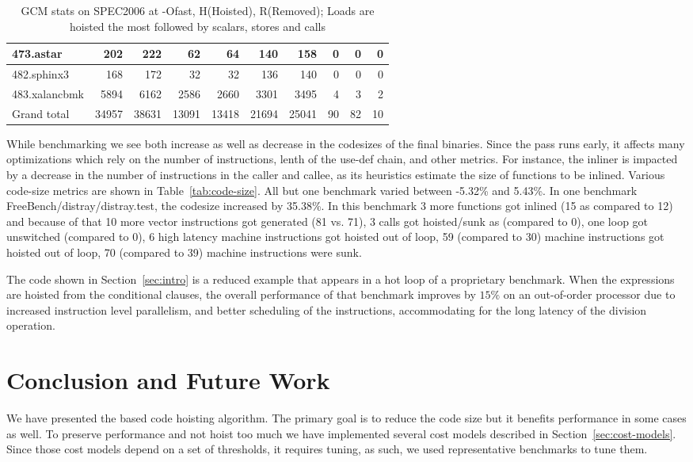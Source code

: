 \documentclass[acmlarge,review,anonymous]{acmart}\settopmatter{printfolios=true}
\begin{document}
\begin{table}[h!]
\begin{center}
\begin{tabular}{|l|r|r|r|r|r|r|r|r|r|}
 473.astar	  &  202	& 222	  &  62	  & 64	   & 140	& 158		& 0	& 0	& 0		\\\hline
 482.sphinx3	  &  168	& 172	  &  32	  & 32	   & 136	& 140		& 0	& 0	& 0		\\\hline
 483.xalancbmk	  &  5894	& 6162	  &  2586 & 2660   & 3301	& 3495		& 4	& 3	& 2	        \\\hline
 Grand total      &34957	&38631	  &13091  &13418   &21694	&25041	        &90	&82     &10             \\\hline
    \end{tabular}
  \end{center}
  \caption{GCM stats on SPEC2006 at -Ofast, H(Hoisted), R(Removed); Loads are hoisted the most followed by scalars, stores and calls}
  \label{tab:code-motion-metric}
\end{table}


While benchmarking \SPEC{} we see both increase as well as decrease in
the codesizes of the final binaries. Since the pass runs early, it affects many
optimizations which rely on the number of instructions, lenth of the use-def
chain, and other metrics. For instance, the inliner is impacted by a decrease in
the number of instructions in the caller and callee, as its heuristics estimate
the size of functions to be inlined. Various code-size metrics are shown in
Table~\ref{tab:code-size}. All but one benchmark varied between -5.32\% and
5.43\%.  In one benchmark FreeBench/distray/distray.test, the codesize increased
by 35.38\%. In this benchmark 3 more functions got inlined (15 as compared to
12) and because of that 10 more vector instructions got generated (81 vs. 71), 3
calls got hoisted/sunk as (compared to 0), one loop got unswitched (compared to
0), 6 high latency machine instructions got hoisted out of loop, 59 (compared to
30) machine instructions got hoisted out of loop, 70 (compared to 39) machine
instructions were sunk.

The code shown in Section~\ref{sec:intro} is a reduced example that appears in a
hot loop of a proprietary benchmark.  When the expressions are hoisted from the
conditional clauses, the overall performance of that benchmark improves by
$15\%$ on an out-of-order processor due to increased instruction level
parallelism, and better scheduling of the instructions, accommodating for the
long latency of the division operation.

\section{Conclusion and Future Work}
\label{sec:future-work}
We have presented the \GVN{} based code hoisting algorithm. The primary goal is to
reduce the code size but it benefits performance in some cases as well. To
preserve performance and not hoist too much we have implemented several cost
models described in Section~\ref{sec:cost-models}. Since those cost models
depend on a set of thresholds, it requires tuning, as such, we used
representative benchmarks to tune them.
\end{document}
